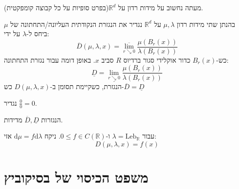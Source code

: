 \documentclass{tstextbook}
\begin{document}
מעתה נחשוב על מידות רדון על \(\mathbb{R}^{d}\)(בפרט סופיות על כל קבוצה קומפקטית).

\begin{definition}
בהנתן שתי מידות רדון \(\mu,\lambda\) על \(\mathbb{R}^{d}\) נגדיר את הנגזרת הנקודתית העליונה/התחתונה של \(\mu\) ביחס ל-\(\lambda\) על ידי:
$$\overline{D} \left( \mu,\lambda,x \right)=\overline{\lim_{ r\searrow 0 } } \frac{\mu(B_{r}(x))}{\lambda(B_{r}(x))}$$
כש-\(B_{r}(x)\) כדור אוקלידי סגור ברדיוס \(R\) סביב \(x\). באופן דומה עבור נגזרת התחתונה:
$$\underline{D}=\underline{\lim_{ r \searrow 0 } }  \frac{\mu(B_{r}(x))}{\lambda(B_{r}(x))}$$
הנגזרת, כשקיימת תסומן ב-\(D\left( \mu,\lambda,x \right)\) כש-\(\overline{D}=\underline{D}\)

\end{definition}
\begin{remark}
נגדיר \(\frac{0}{0}=0\).

\end{remark}
\begin{remark}
הנגזרות \(\overline{D},\underline{D}\) מדידות.

\end{remark}
\begin{example}
עבור \(\lambda=\mathrm{Leb}_{\mathbb{R}}\) ו-\(0\leq f \in C\left( \mathbb{R} \right)\). ניקח \(\mathrm{d}\mu=f\mathrm{d}\lambda\) אזי:
$$D\left( \mu,\lambda,x \right)=f(x)$$

\end{example}
\section{משפט הכיסוי של בסיקוביץ}
\end{document}
